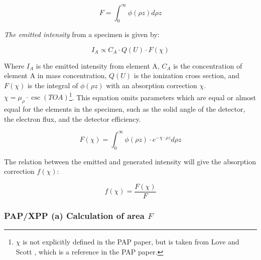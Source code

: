 \begin{equation}
    \label{eq:theory:quantitative:pap:general_principle:F}
    F = \int_0^\infty \phi(\rho z) d\rho z
\end{equation}


\emph{The emitted intensity} from a specimen is given by:

\begin{equation}
    \label{eq:theory:quantitative:pap:general_principle:I_A}
    I_A \propto C_A \cdot Q(U) \cdot F(\chi)
\end{equation}

Where $I_A$ is the emitted intensity from element A, $C_A$ is the concentration of element A in mass concentration, $Q(U)$ is the ionization cross section, and $F(\chi)$ is the integral of $\phi(\rho z)$ with an absorption correction $\chi$.
$ \chi = \mu_\rho \cdot \csc(TOA)$\footnote{$\chi$ is not explicitly defined in the PAP paper, but is taken from Love and Scott \cite[Eq. (1)]{love_scott_1990}, which is a reference in the PAP paper.}.
This equation omits parameters which are equal or almost equal for the elements in the specimen, such as the solid angle of the detector, the electron flux, and the detector efficiency.


\begin{equation}
    \label{eq:theory:quantitative:pap:general_principle:f_of_chi}
    F(\chi) = \int_0^\infty \phi(\rho z) \cdot e^{-\chi \cdot \rho z} d\rho z
\end{equation}


The relation between the emitted and generated intensity will give the absorption correction $f(\chi)$:

\begin{equation}
    \label{eq:theory:quantitative:pap:general_principle:f_absorption_correction}
    f(\chi) = \frac{F(\chi)}{F}
\end{equation}















\subsubsection{PAP/XPP (a) Calculation of area $F$}

